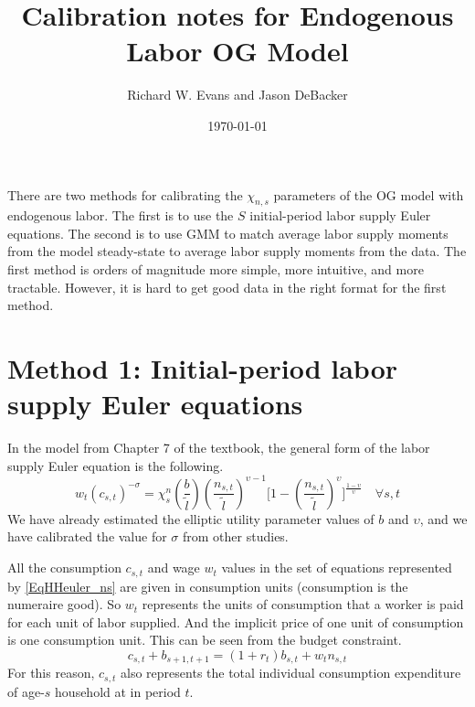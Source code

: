 \documentclass[letterpaper,12pt]{article}
\theoremstyle{definition}
\begin{document}
\title{Calibration notes for Endogenous Labor OG Model}
\date{\today}
\author{Richard W. Evans and Jason DeBacker}
\maketitle



There are two methods for calibrating the $\chi_{n,s}$ parameters of the OG model with endogenous labor. The first is to use the $S$ initial-period labor supply Euler equations. The second is to use GMM to match average labor supply moments from the model steady-state to average labor supply moments from the data. The first method is orders of magnitude more simple, more intuitive, and more tractable. However, it is hard to get good data in the right format for the first method.


\section{Method 1: Initial-period labor supply Euler equations}

  In the model from Chapter 7 of the textbook, the general form of the labor supply Euler equation is the following.
  \begin{equation}\label{EqHHeuler_ns}
    w_t\left(c_{s,t}\right)^{-\sigma} = \chi^n_s\left(\frac{b}{\tilde{l}}\right)\left(\frac{n_{s,t}}{\tilde{l}}\right)^{\upsilon-1}\Biggl[1 - \left(\frac{n_{s,t}}{\tilde{l}}\right)^\upsilon\Biggr]^{\frac{1-\upsilon}{\upsilon}} \quad\forall s, t
  \end{equation}
  We have already estimated the elliptic utility parameter values of $b$ and $\upsilon$, and we have calibrated the value for $\sigma$ from other studies.

  All the consumption $c_{s,t}$ and wage $w_t$ values in the set of equations represented by \eqref{EqHHeuler_ns} are given in consumption units (consumption is the numeraire good). So $w_t$ represents the units of consumption that a worker is paid for each unit of labor supplied. And the implicit price of one unit of consumption is one consumption unit. This can be seen from the budget constraint.
  \begin{equation}\label{EqHHbc}
    c_{s,t} + b_{s+1,t+1} = (1 + r_t)b_{s,t} + w_t n_{s,t}
  \end{equation}
  For this reason, $c_{s,t}$ also represents the total individual consumption expenditure of age-$s$ household at in period $t$.
\end{document}
